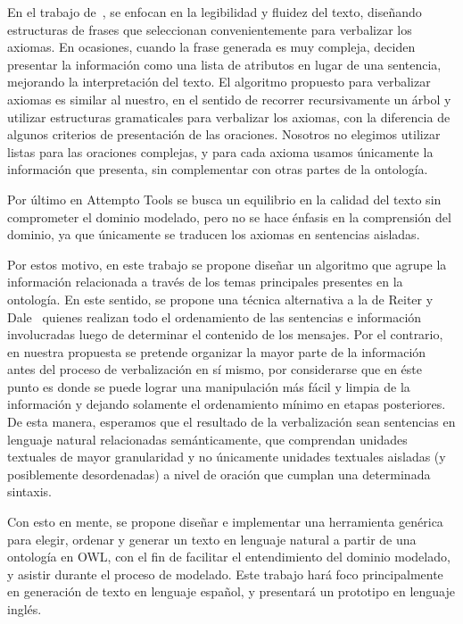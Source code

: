En el trabajo de~\cite{hewlett2005effective}, se enfocan en la legibilidad y fluidez del texto, diseñando estructuras de frases que seleccionan convenientemente para verbalizar los axiomas. En ocasiones, cuando la frase generada es muy compleja, deciden presentar la información como una lista de atributos en lugar de una sentencia, mejorando la interpretación del texto. El algoritmo propuesto para verbalizar axiomas es similar al nuestro, en el sentido de recorrer recursivamente un árbol y utilizar estructuras gramaticales para verbalizar los axiomas, con la diferencia de algunos criterios de presentación de las oraciones. Nosotros no elegimos utilizar listas para las oraciones complejas, y para cada axioma usamos únicamente la información que presenta, sin complementar con otras partes de la ontología.

Por último en Attempto Tools se busca un equilibrio en la calidad del texto sin comprometer el dominio modelado, pero no se hace énfasis en la comprensión del dominio, ya que únicamente se traducen los axiomas en sentencias aisladas. 

Por estos motivo, en este trabajo se propone diseñar un algoritmo que agrupe la información relacionada a través de los temas principales presentes en la ontología. 
En este sentido, se propone una técnica alternativa a la de Reiter y Dale~\cite{reiter1997building} quienes realizan todo el ordenamiento de las sentencias e información involucradas luego de determinar el contenido de los mensajes. Por el contrario, en nuestra propuesta se pretende organizar la mayor parte de la información antes del proceso de verbalización en sí mismo, por considerarse que en éste punto es donde se puede lograr una manipulación más fácil y limpia de la información y dejando solamente el ordenamiento mínimo en etapas posteriores. De esta manera, esperamos que el resultado de la verbalización sean sentencias en lenguaje natural relacionadas semánticamente, que comprendan unidades textuales de mayor granularidad y no únicamente unidades textuales  aisladas (y posiblemente desordenadas) a nivel de oración  que cumplan una determinada sintaxis.

Con esto en mente, se propone diseñar e implementar una herramienta genérica para elegir, ordenar y generar un texto en lenguaje natural a partir de una ontología en OWL, con el fin de facilitar el entendimiento del dominio modelado, y asistir durante el proceso de modelado. Este trabajo hará foco principalmente en generación de texto en lenguaje español, y presentará un prototipo en lenguaje inglés.

